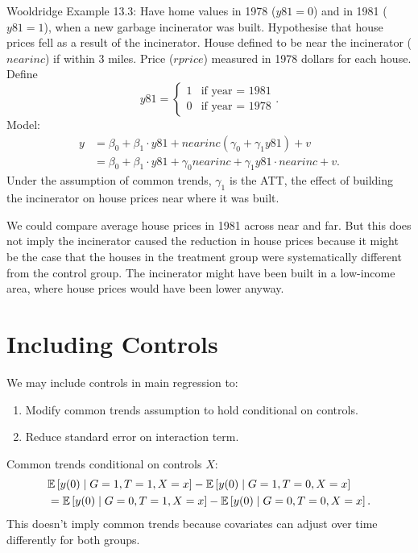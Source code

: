 \begin{example}
	Wooldridge Example 13.3: Have home values in 1978 ($y81=0$) and in 1981 ($y81=1$), when a new garbage incinerator was built. Hypothesise that house prices fell as a result of the incinerator. House defined to be near the incinerator ($nearinc$) if within 3 miles. Price ($rprice$) measured in 1978 dollars for each house. Define
	\[
		y81 =
		\begin{cases}
			1 & \text{if year = 1981} \\
			0 & \text{if year = 1978}
		\end{cases}
	.\]
	Model:
	\begin{align*}
		y
		&= \beta_0 + \beta_1 \cdot y81 + nearinc\left(\gamma_0 + \gamma_1 y81\right) + v \\
		&= \beta_0 + \beta_1 \cdot y81 + \gamma_0 nearinc + \gamma_1 y81 \cdot nearinc + v
	.\end{align*}
	Under the assumption of common trends, $\gamma_1$ is the ATT, the effect of building the incinerator on house prices near where it was built.
\end{example}

\begin{remark}
	We could compare average house prices in 1981 across near and far. But this does not imply the incinerator caused the reduction in house prices because it might be the case that the houses in the treatment group were systematically different from the control group. The incinerator might have been built in a low-income area, where house prices would have been lower anyway.
\end{remark}

\section{Including Controls}

\begin{remark}
	We may include controls in main regression to:
	\begin{enumerate}[label=(\roman*)]
		\item Modify common trends assumption to hold conditional on controls.
		\item Reduce standard error on interaction term.
	\end{enumerate}
\end{remark}

\begin{assumption}
	Common trends conditional on controls $X$:
	\begin{align*}
		&\mathbb{E}\left[y(0) \mid G=1, T=1, X=x\right] - \mathbb{E}\left[y(0) \mid G=1, T=0, X=x\right] \\
		&= \mathbb{E}\left[y(0) \mid G=0, T=1, X=x\right] - \mathbb{E}\left[y(0) \mid G=0, T=0, X=x\right]
	.\end{align*}
	This doesn't imply common trends because covariates can adjust over time differently for both groups.
\end{assumption}

